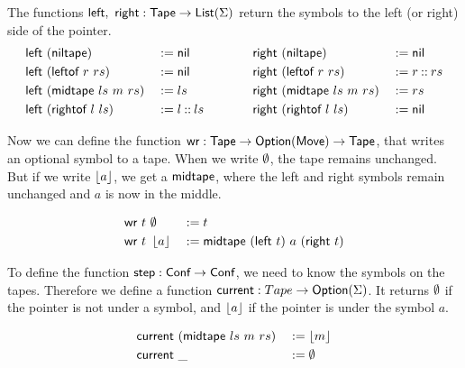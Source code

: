 \begin{definition}
  The functions $\textsf{left},~\textsf{right} : \textsf{Tape} \rightarrow \textsf{List}(\Sigma)$ return the symbols to the left (or right) side of the pointer.
  \begin{alignat*}{4}
    \textsf{left} &~(\textsf{niltape})                 &&:= \textsf{nil}
    \quad\quad\quad\quad
    & \textsf{right}&~(\textsf{niltape})               &&:= \textsf{nil} \\
    \textsf{left} &~(\textsf{leftof}~{r}~{rs})         &&:= \textsf{nil}
    & \textsf{right}&~(\textsf{leftof}~{r}~{rs})       &&:= r \mathbin{::} rs \\
    \textsf{left} &~(\textsf{midtape}~{ls}~{m}~{rs})   &&:= ls
    & \textsf{right}&~(\textsf{midtape}~{ls}~{m}~{rs}) &&:= rs \\
    \textsf{left} &~(\textsf{rightof}~{l}~{ls})        &&:= l \mathbin{::} ls
    & \textsf{right}&~(\textsf{rightof}~{l}~{ls})      &&:= \textsf{nil}
  \end{alignat*}
\end{definition}


Now we can define the function $\textsf{wr} : \textsf{Tape} \rightarrow \textsf{Option}(\textsf{Move}) \rightarrow \textsf{Tape}$, that writes an optional symbol to a tape.  When we write $\emptyset$,
the tape remains unchanged.  But if we write $\left\lfloor {a}\right\rfloor$, we get a $\textsf{midtape}$, where the left and right symbols remain unchanged and $a$ is now in
the middle.

\begin{definition}[$\MS{wr}$]
  \begin{alignat*}{3}
    \textsf{wr}~t &~ \emptyset   &&:= t \\
    \textsf{wr}~t &~ \left\lfloor {a}\right\rfloor &&:= \textsf{midtape}~(\textsf{left}~t)~{a}~(\textsf{right}~t)
  \end{alignat*}
\end{definition}

To define the function $\textsf{step} : \textsf{Conf} \rightarrow \textsf{Conf}$, we need to know the symbols on the tapes.
Therefore we define a function $\textsf{current} : Tape \rightarrow \textsf{Option}(\Sigma)$.
It returns $\emptyset$ if the pointer is not under a symbol, and $\left\lfloor {a}\right\rfloor$ if the pointer is under the symbol $a$.

\begin{definition}[$\MS{current}$]
  \begin{alignat*}{2}
    \textsf{current}&~(\textsf{midtape}~{ls}~{m}~{rs})&&:= \left\lfloor {m}\right\rfloor \\
    \textsf{current}&~\_                          &&:= \emptyset
  \end{alignat*}
\end{definition}

